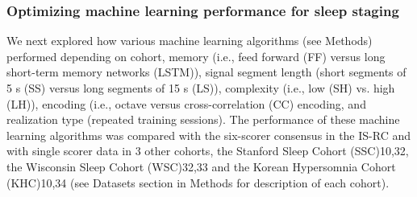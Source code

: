\subsubsection{Optimizing machine learning performance for sleep staging}
We next explored how various machine learning algorithms (see Methods) performed depending on cohort, memory (i.e., feed forward (FF) versus long short-term memory networks (LSTM)), signal segment length (short segments of 5 s (SS) versus long segments of 15 s (LS)), complexity (i.e., low (SH) vs. high (LH)), encoding (i.e., octave versus cross-correlation (CC) encoding, and realization type (repeated training sessions).
The performance of these machine learning algorithms was compared with the six-scorer consensus in the IS-RC and with single scorer data in 3 other cohorts, the Stanford Sleep Cohort (SSC)10,32, the Wisconsin Sleep Cohort (WSC)32,33 and the Korean Hypersomnia Cohort (KHC)10,34 (see Datasets section in Methods for description of each cohort).

